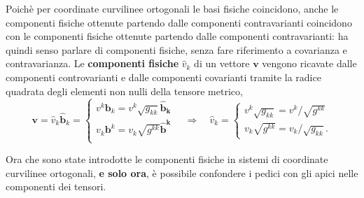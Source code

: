  Poichè per coordinate curvilinee ortogonali le basi fisiche coincidono, anche le componenti fisiche ottenute partendo dalle componenti
 contravarianti coincidono con le componenti fisiche ottenute partendo dalle componenti contravarianti: ha quindi senso parlare di componenti
 fisiche, senza fare riferimento a covarianza e contravarianza. Le \textbf{componenti fisiche} $\hat{v}_k$ di un vettore $\bm{v}$ vengono ricavate dalle componenti controvarianti e dalle componenti covarianti tramite la radice quadrata degli elementi non nulli della tensore metrico,
 \begin{equation}
 \bm{v} = \hat{v}_k \bm{\hat{b}}_k = \begin{cases}
   v^k \bm{b}_k = v^k \sqrt{g_{kk}} \bm{\hat{b}_k}  \\
   v_k \bm{b}^k = v_k \sqrt{g^{kk}} \bm{\hat{b}^k}  \\
 \end{cases} \quad \Rightarrow \quad
  \hat{v}_k =
 \begin{cases}  v^k  \sqrt{g_{kk}} = v^k / \sqrt{g^{kk}}  \\ v_k  \sqrt{g^{kk}} = v_k / \sqrt{g_{kk}} .
 \end{cases}
 \end{equation}
\begin{remark}
Ora che sono state introdotte le componenti fisiche in sistemi
 di coordinate curvilinee ortogonali, \textbf{e solo ora}, è possibile confondere i pedici con gli apici nelle componenti dei tensori.
\end{remark}
 
